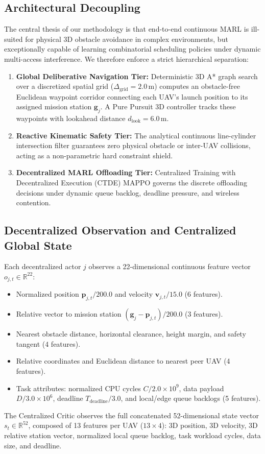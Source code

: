 \documentclass[conference]{IEEEtran}
\begin{document}
\subsection{Architectural Decoupling}
The central thesis of our methodology is that end-to-end continuous MARL is ill-suited for physical 3D obstacle avoidance in complex environments, but exceptionally capable of learning combinatorial scheduling policies under dynamic multi-access interference. We therefore enforce a strict hierarchical separation:
\begin{enumerate}
    \item \textbf{Global Deliberative Navigation Tier:} Deterministic 3D A* graph search over a discretized spatial grid ($\Delta_{\text{grid}} = 2.0$\,m) computes an obstacle-free Euclidean waypoint corridor connecting each UAV's launch position to its assigned mission station $\mathbf{g}_j$. A Pure Pursuit 3D controller tracks these waypoints with lookahead distance $d_{\text{look}} = 6.0$\,m.
    \item \textbf{Reactive Kinematic Safety Tier:} The analytical continuous line-cylinder intersection filter guarantees zero physical obstacle or inter-UAV collisions, acting as a non-parametric hard constraint shield.
    \item \textbf{Decentralized MARL Offloading Tier:} Centralized Training with Decentralized Execution (CTDE) MAPPO governs the discrete offloading decisions under dynamic queue backlog, deadline pressure, and wireless contention.
\end{enumerate}

\subsection{Decentralized Observation and Centralized Global State}
Each decentralized actor $j$ observes a 22-dimensional continuous feature vector $o_{j, t} \in \mathbb{R}^{22}$:
\begin{itemize}
    \item Normalized position $\mathbf{p}_{j, t} / 200.0$ and velocity $\mathbf{v}_{j, t} / 15.0$ (6 features).
    \item Relative vector to mission station $(\mathbf{g}_j - \mathbf{p}_{j, t}) / 200.0$ (3 features).
    \item Nearest obstacle distance, horizontal clearance, height margin, and safety tangent (4 features).
    \item Relative coordinates and Euclidean distance to nearest peer UAV (4 features).
    \item Task attributes: normalized CPU cycles $C / 2.0 \times 10^9$, data payload $D / 3.0 \times 10^6$, deadline $T_{\text{deadline}} / 3.0$, and local/edge queue backlogs (5 features).
\end{itemize}
The Centralized Critic observes the full concatenated 52-dimensional state vector $s_t \in \mathbb{R}^{52}$, composed of 13 features per UAV ($13 \times 4$): 3D position, 3D velocity, 3D relative station vector, normalized local queue backlog, task workload cycles, data size, and deadline.
\end{document}
